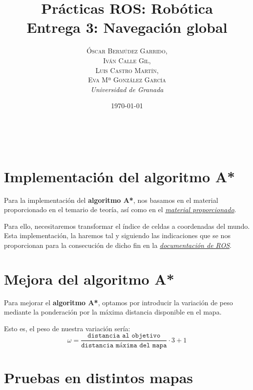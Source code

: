 \documentclass[a4paper, 11pt]{article}
\title{\textbf{Prácticas ROS: Robótica}\\ %
Entrega 3: Navegación global} %
\author{\textsc{Óscar Bermúdez Garrido,\\Iván Calle Gil,\\ Luis Castro Martín,\\ Eva Mª González García} %
\\{\textit{Universidad de Granada}}} %
\date{\today} %
\makeatletter
\renewcommand{\maketitle}{
  \begin{flushright} %
  
  {\LARGE\@title} %
  
  \vspace{50pt} %
  
  {\large\@author} %
  \\\@date %
  \vspace{40pt} %
  \end{flushright}
}
\makeatother
\begin{document}
\maketitle %

\renewcommand{\abstractname}{Resumen} %
\begin{abstract}
\end{abstract}


{\parskip=2pt
  \tableofcontents
}
\pagebreak


\section{Implementación del algoritmo A*}
	Para la implementación del \textbf{algoritmo A*}, nos basamos en el material proporcionado en el
	temario de teoría, así como en el \href{http://theory.stanford.edu/~amitp/GameProgramming/}
	{\textit{material proporcionado}}.

	Para ello, necesitaremos transformar el índice de celdas a coordenadas del mundo. Esta implementación,
	la haremos tal y siguiendo las indicaciones que se nos proporcionan para la consecución de dicho fin
	en la \href{http://docs.ros.org/indigo/api/costmap_2d/html/classcostmap__2d_1_1Costmap2D.html}
	{\textit{documentación de ROS}}.
		

\section{Mejora del algoritmo A*}
	Para mejorar el \textbf{algoritmo A*}, optamos por introducir la variación de peso mediante la
	ponderación por la máxima distancia disponible en el mapa.
	
	Esto es, el peso de nuestra variación sería:
	$$\omega = \frac{\texttt{distancia al objetivo}}{\texttt{distancia máxima del mapa}} \cdot 3 + 1$$

\section{Pruebas en distintos mapas}
\end{document}
